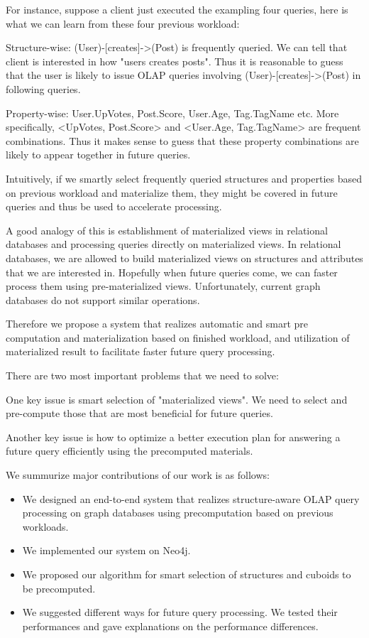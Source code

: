 For instance, suppose a client just executed the exampling four queries, here is what we can learn from these four previous workload:

Structure-wise: (User)-[creates]->(Post) is frequently queried. We can tell that client is interested in how "users creates posts". Thus it is reasonable to guess that the user is likely to issue OLAP queries involving (User)-[creates]->(Post) in following queries.
 
Property-wise: User.UpVotes, Post.Score, User.Age, Tag.TagName etc. More specifically, <UpVotes, Post.Score> and <User.Age, Tag.TagName> are frequent combinations. Thus it makes sense to guess that these property combinations are likely to appear together in future queries.
 
Intuitively, if we smartly select frequently queried structures and properties based on previous workload and materialize them, they might be covered in future queries and thus be used to accelerate processing. 
 
A good analogy of this is establishment of materialized views in relational databases and processing queries directly on materialized views. In relational databases, we are allowed to build materialized views on structures and attributes that we are interested in. Hopefully when future queries come, we can faster process them using pre-materialized views. Unfortunately, current graph databases do not support similar operations. 
 
Therefore we propose a system that realizes automatic and smart pre computation and materialization based on finished workload, and utilization of materialized result to facilitate faster future query processing. 
 
There are two most important problems that we need to solve: 
 
One key issue is smart selection of "materialized views". We need to select and pre-compute those that are most beneficial for future queries. 
 
Another key issue is how to optimize a better execution plan for answering a future query efficiently using the precomputed materials.

We summurize major contributions of our work is as follows:
\begin{itemize}
\item {We designed an end-to-end system that realizes structure-aware OLAP query processing on graph databases using precomputation based on previous workloads.}

\item We implemented our system on Neo4j.

\item We proposed our algorithm for smart selection of structures and cuboids to be precomputed.
 
\item We suggested different ways for future query processing. We tested their performances and gave explanations on the performance differences.
 
 \end{itemize}

